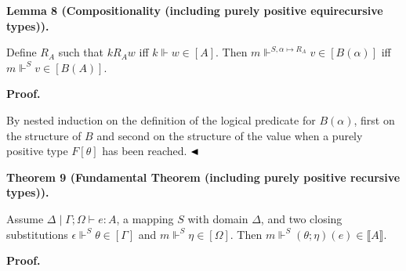 \documentclass[10pt,a4paper]{amsart}
\begin{document}
 
 
\par\medskip\noindent\textbf{Lemma 8 (Compositionality (including purely positive equirecursive types)).}\par
 
 
Define $R_{A}$ such that $k\mathrel{R_{A}}w$ iff $k\Vdash w\in[A]$. Then $m\Vdash^{S,\alpha\mapsto R_{A}}v\in[B(\alpha)]$ iff $m\Vdash^{S}v\in[B(A)]$.\par
 
 
 

 
\par\medskip\noindent\textbf{Proof.}\par
 
 
By nested induction on the definition of the logical predicate for $B(\alpha)$, first on the structure of $B$ and second on the structure of the value when a purely positive type $F[\theta]$ has been reached. $\hfill\blacktriangleleft$\par
 

 
\par\medskip\noindent\textbf{Theorem 9 (Fundamental Theorem (including purely positive recursive types)).}\par
 
 
Assume $\Delta\mid\Gamma\mathrel{;}\Omega\vdash e:A$, a mapping $S$ with domain $\Delta$, and two closing substitutions $\epsilon\Vdash^{S}\theta\in[\Gamma]$ and $m\Vdash^{S}\eta\in[\Omega]$. Then $m\Vdash^{S}(\theta\mathrel{;}\eta)(e)\in\llbracket A\rrbracket$.\par
 
 

 
\par\medskip\noindent\textbf{Proof.}\par
 
 
\end{document}
